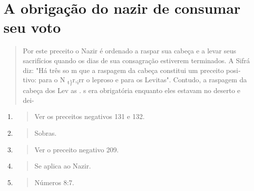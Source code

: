 \section{A obrigação do nazir de consumar seu voto}

\begin{quote}
Por este preceito o Nazir é ordenado a raspar sua cabeça e a levar seus
sacrifícios quando os dias de sua consagração estiverem terminados. A
Si­frá diz: "Há três so m que a raspagem da cabeça constitui um preceito
posi­tivo: para o N \textsubscript{t\}}r,\textsubscript{i}rr o leproso e
para os Levitas". Contudo, a raspagem da cabeça dos Lev as
. s era obrigatória enquanto eles estavam no deserto e
dei-
\end{quote}

\begin{enumerate}
\def\labelenumi{\arabic{enumi}.}
\setcounter{enumi}{121}
\item
 \begin{quote}
 Ver os preceitos negativos 131 e 132.
 \end{quote}
\item
 \begin{quote}
 Sobras.
 \end{quote}
\item
 \begin{quote}
 Ver o preceito negativo 209.
 \end{quote}
\item
 \begin{quote}
 Se aplica ao Nazir.
 \end{quote}
\item
 \begin{quote}
 Números 8:7.
 \end{quote}
\end{enumerate}

